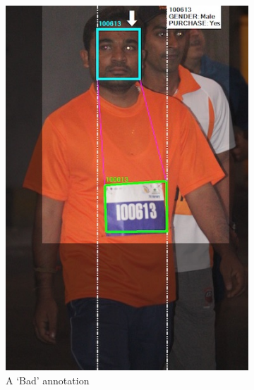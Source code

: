 \begin{figure}[p]
\begin{subfigure}[b]{0.30\textwidth}
    \includegraphics[width=\textwidth]{images/dataset/argus/quality_tagging_bad_invalid_rbn}
    \caption{A `Bad' annotation}
    \label{fig:dataset:argus:qualituy_tiers:bad_invalid_rbn}
  \end{subfigure}
  \hspace{\fill}
  \begin{subfigure}[b]{0.30\textwidth}

\end{subfigure}
\end{figure}
